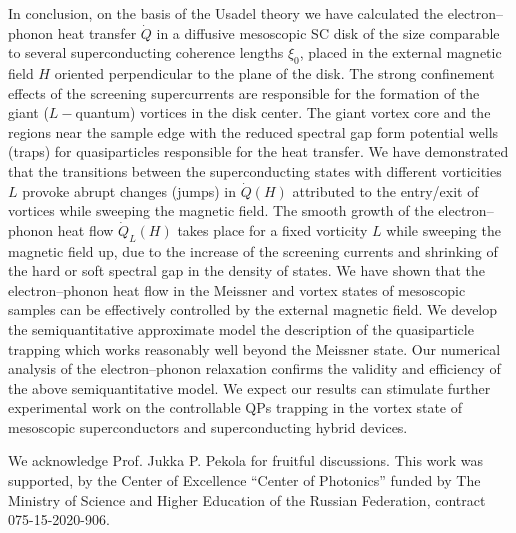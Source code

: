 \documentclass[prx,twocolumn,aps,superscriptaddress,showpacs,amsmath,amssymb,footnoteinbib]{revtex4-1}
\begin{document}
In conclusion, on the basis of the Usadel theory we have
calculated the electron--phonon heat transfer $\dot{Q}$ in a
diffusive mesoscopic SC disk of the size comparable to several
superconducting coherence lengths $\xi_0$,  placed in the external
magnetic field $H$ oriented perpendicular to the plane of the
disk. The strong confinement effects of the screening
supercurrents are responsible for the formation of the giant
($L-$quantum) vortices in the disk center. The giant vortex core
and the regions near the sample edge with the reduced spectral gap
form potential wells (traps) for quasiparticles responsible for
the heat transfer. We have demonstrated that the transitions
between the superconducting states with different vorticities $L$
provoke abrupt changes (jumps) in $\dot{Q}(H)$ attributed to the
entry/exit of vortices while sweeping the magnetic field. The
smooth growth of the electron--phonon heat flow  $\dot{Q}_L(H)$
takes place for a fixed vorticity $L$ while sweeping the magnetic
field up, due to the increase of the screening currents and
shrinking of the hard or soft spectral gap in the density of
states. We have shown that the electron--phonon heat flow in the
Meissner and vortex states of mesoscopic samples can be
effectively controlled by the  external magnetic field.
We develop the semiquantitative approximate model the description of the
quasiparticle trapping which works reasonably well beyond the Meissner state.
Our numerical analysis of the electron--phonon relaxation confirms
the validity and efficiency of the above
semiquantitative model. We expect our results can stimulate
further experimental work on the controllable QPs trapping in the
vortex state of mesoscopic superconductors and superconducting hybrid devices.

\acknowledgments 
We acknowledge Prof. Jukka P. Pekola for fruitful discussions.
This work was supported,  by the
Center of Excellence ``Center of Photonics''
funded by The Ministry of Science and Higher Education of the Russian
Federation, contract 075-15-2020-906.


\onecolumngrid
\appendix
\end{document}
